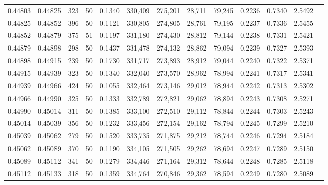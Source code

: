 \begin{tabular}{rrrrrrrrrrrrr}
0.44803 & 0.44825 &   323 &  50 &                                     0.1340 & 330,409 & 275,201 &  28,711 &  79,245 & 0.2236 & 0.7340 & 2.5492 \\
0.44825 & 0.44852 &   396 &  50 &                                     0.1121 & 330,805 & 274,805 &  28,761 &  79,195 & 0.2237 & 0.7336 & 2.5455 \\
0.44852 & 0.44879 &   375 &  51 &                                     0.1197 & 331,180 & 274,430 &  28,812 &  79,144 & 0.2238 & 0.7331 & 2.5421 \\
0.44879 & 0.44898 &   298 &  50 &                                     0.1437 & 331,478 & 274,132 &  28,862 &  79,094 & 0.2239 & 0.7327 & 2.5393 \\
0.44898 & 0.44915 &   239 &  50 &                                     0.1730 & 331,717 & 273,893 &  28,912 &  79,044 & 0.2240 & 0.7322 & 2.5371 \\
0.44915 & 0.44939 &   323 &  50 &                                     0.1340 & 332,040 & 273,570 &  28,962 &  78,994 & 0.2241 & 0.7317 & 2.5341 \\
0.44939 & 0.44966 &   424 &  50 &                                     0.1055 & 332,464 & 273,146 &  29,012 &  78,944 & 0.2242 & 0.7313 & 2.5302 \\
0.44966 & 0.44990 &   325 &  50 &                                     0.1333 & 332,789 & 272,821 &  29,062 &  78,894 & 0.2243 & 0.7308 & 2.5271 \\
0.44990 & 0.45014 &   311 &  50 &                                     0.1385 & 333,100 & 272,510 &  29,112 &  78,844 & 0.2244 & 0.7303 & 2.5243 \\
0.45014 & 0.45039 &   356 &  50 &                                     0.1232 & 333,456 & 272,154 &  29,162 &  78,794 & 0.2245 & 0.7299 & 2.5210 \\
0.45039 & 0.45062 &   279 &  50 &                                     0.1520 & 333,735 & 271,875 &  29,212 &  78,744 & 0.2246 & 0.7294 & 2.5184 \\
0.45062 & 0.45089 &   370 &  50 &                                     0.1190 & 334,105 & 271,505 &  29,262 &  78,694 & 0.2247 & 0.7289 & 2.5150 \\
0.45089 & 0.45112 &   341 &  50 &                                     0.1279 & 334,446 & 271,164 &  29,312 &  78,644 & 0.2248 & 0.7285 & 2.5118 \\
0.45112 & 0.45133 &   318 &  50 &                                     0.1359 & 334,764 & 270,846 &  29,362 &  78,594 & 0.2249 & 0.7280 & 2.5089 \\

\end{tabular}
